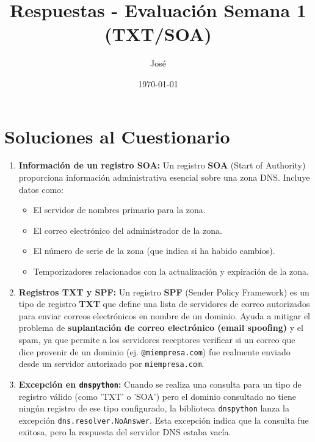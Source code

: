 \documentclass{article}
\title{Respuestas - Evaluación Semana 1 (TXT/SOA)}
\author{José}
\date{\today}
\begin{document}
\maketitle

\section*{Soluciones al Cuestionario}

\begin{enumerate}
    \item \textbf{Información de un registro SOA:}
    Un registro \textbf{SOA} (Start of Authority) proporciona información administrativa esencial sobre una zona DNS. Incluye datos como:
    \begin{itemize}
        \item El servidor de nombres primario para la zona.
        \item El correo electrónico del administrador de la zona.
        \item El número de serie de la zona (que indica si ha habido cambios).
        \item Temporizadores relacionados con la actualización y expiración de la zona.
    \end{itemize}

    \item \textbf{Registros TXT y SPF:}
    Un registro \textbf{SPF} (Sender Policy Framework) es un tipo de registro \textbf{TXT} que define una lista de servidores de correo autorizados para enviar correos electrónicos en nombre de un dominio. Ayuda a mitigar el problema de \textbf{suplantación de correo electrónico (email spoofing)} y el spam, ya que permite a los servidores receptores verificar si un correo que dice provenir de un dominio (ej. \texttt{@miempresa.com}) fue realmente enviado desde un servidor autorizado por \texttt{miempresa.com}.

    \item \textbf{Excepción en \texttt{dnspython}:}
    Cuando se realiza una consulta para un tipo de registro válido (como 'TXT' o 'SOA') pero el dominio consultado no tiene ningún registro de ese tipo configurado, la biblioteca \texttt{dnspython} lanza la excepción \texttt{dns.resolver.NoAnswer}. Esta excepción indica que la consulta fue exitosa, pero la respuesta del servidor DNS estaba vacía.

\end{enumerate}
\end{document}
